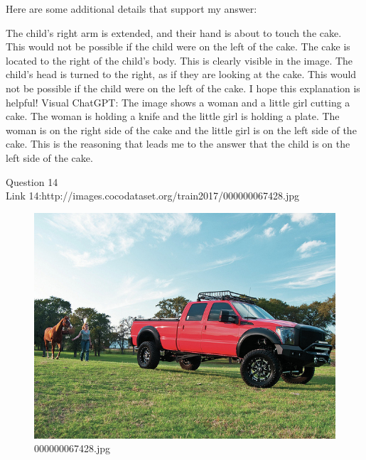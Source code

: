 \begin{enumerate}
        Here are some additional details that support my answer:

        The child's right arm is extended, and their hand is about to touch the cake. This would not be possible if the child were on the left of the cake.
        The cake is located to the right of the child's body. This is clearly visible in the image.
        The child's head is turned to the right, as if they are looking at the cake. This would not be possible if the child were on the left of the cake.
        I hope this explanation is helpful!
        \subitem Visual ChatGPT: The image shows a woman and a little girl cutting a cake. The woman is holding a knife and the little girl is holding a plate. The woman is on the right side of the cake and the little girl is on the left side of the cake. This is the reasoning that leads me to the answer that the child is on the left side of the cake.
    \end{enumerate}
Question 14\\
Link 14:http://images.cocodataset.org/train2017/000000067428.jpg
    \begin{figure}[h]
        \centering
        \includegraphics[width=0.8\linewidth]{../image set/easy/000000067428.jpg}
        \caption{000000067428.jpg}
    \end{figure}
